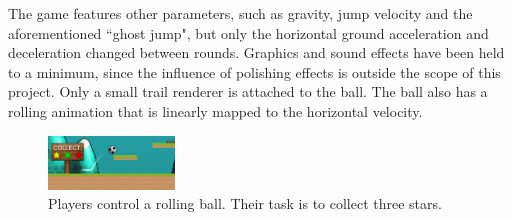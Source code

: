 
The game features other parameters, such as gravity, jump velocity and the aforementioned ``ghost jump", but only the horizontal ground acceleration and deceleration changed between rounds. Graphics and sound effects have been held to a minimum, since the influence of polishing effects is outside the scope of this project. Only a small trail renderer is attached to the ball. The ball also has a rolling animation that is linearly mapped to the horizontal velocity.

\begin{figure}[htbp]
\centering
\includegraphics[width=0.3\textwidth]{Pics/gf}
\caption{Players control a rolling ball. Their task is to collect three stars.}
\label{fig:game}
\end{figure}

